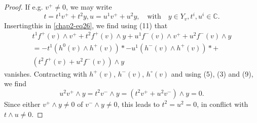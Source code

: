 \begin{proof}
If e.g. $v^{+}\neq 0$, we may write
$$
t=t^{1}v^{+}+t^{2}y, u=u^{1}v^{+}+u^{2}y,\text{~~ with~~ } y\in Y_{v},
t^{i}, u^{i}\in \mathbb{C}.
$$
Inserting\pageoriginale this in \eqref{chap2-eq26}, we find
using (11) that
\begin{gather*}
t^{1}f^{+}(v)\wedge v^{+}+t^{2}f^{+}(v)\wedge y+u^{1}f^{-}(v)\wedge
v^{+}+u^{2}f^{-}(v)\wedge y\\[4pt]
=-t^{1}(h^{0}(v)\wedge h^{+}(v))*-u^{1}(h^{-}(v)\wedge h^{+}(v))*+\\[4pt]
(t^{2}f^{+}(v)+u^{2}f^{-}(v))\wedge y
\end{gather*}
vanishes. Contracting with $h^{+}(v)$, $h^{-}(v)$, $h^{\circ}(v)$ and
using (5), (3) and (9), we
find
$$
u^{2}v^{+}\wedge y=t^{2}v^{-}\wedge y=(t^{2}v^{+}+u^{2}v^{-})\wedge y=0.
$$
Since either $v^{+}\wedge y\neq 0$ of $v^{-}\wedge y\neq 0$, this
leads to $t^{2}=u^{2}=0$, in conflict with $t\wedge u\neq 0$.


\end{proof}
